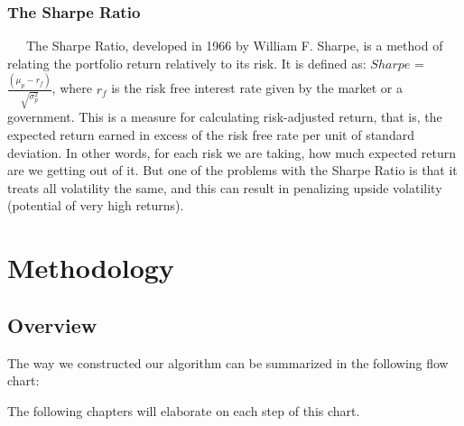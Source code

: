 \documentclass[12pt,titlepage,a4paper]{article}
\begin{document}
		\subsubsection{The Sharpe Ratio}
		\ \ \  The Sharpe Ratio, developed in 1966 by William F. Sharpe, is a method of relating the portfolio return relatively to its risk. It is defined as: $Sharpe$ = $\frac{(\mu_p - r_f)}{\sqrt{\sigma_p^2}}$, where $r_f$ is the risk free interest rate given by the market or a government.  This is a measure for calculating risk-adjusted return, that is, the expected return earned in excess of the risk free rate per unit of standard deviation. In other words, for each risk we are taking, how much expected return are we getting out of it. But one of the problems with the Sharpe Ratio is that it treats all volatility the same, and this can result in penalizing upside volatility (potential of very high returns).\\

\section{Methodology}
	\subsection{Overview}
		The way we constructed our algorithm can be summarized in the following flow chart:
		\begin{center}
		\end{center}
		The following chapters will elaborate on each step of this chart.
	
\end{document}
